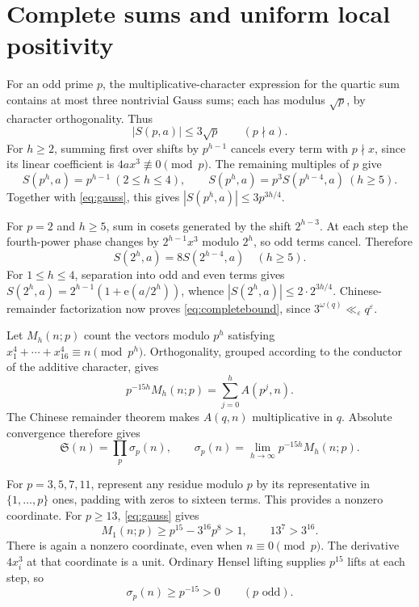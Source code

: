 \documentclass[11pt]{article}
\theoremstyle{remark}\newtheorem*{remark}{Remark}
\newcommand{\e}{\mathrm e}
\newcommand{\eps}{\varepsilon}
\newcommand{\SSS}{\mathfrak S}
\begin{document}
\section{Complete sums and uniform local positivity}\label{sec:complete}

For an odd prime \(p\), the multiplicative-character expression for the
quartic sum contains at most three nontrivial Gauss sums; each has
modulus \(\sqrt p\), by character orthogonality. Thus
\begin{equation}\label{eq:gauss}
 |S(p,a)|\le3\sqrt p\qquad(p\nmid a).
\end{equation}
For \(h\ge2\), summing first over shifts by \(p^{h-1}\) cancels
every term with \(p\nmid x\), since its linear coefficient is
\(4ax^3\not\equiv0\pmod p\). The remaining multiples of \(p\) give
\begin{equation}\label{eq:oddrec}
 S(p^h,a)=p^{h-1}\ (2\le h\le4),\qquad
 S(p^h,a)=p^3S(p^{h-4},a)\ (h\ge5).
\end{equation}
Together with \eqref{eq:gauss}, this gives
\(|S(p^h,a)|\le3p^{3h/4}\).

For \(p=2\) and \(h\ge5\), sum in cosets generated by the shift
\(2^{h-3}\). At each step the fourth-power phase changes by
\(2^{h-1}x^3\) modulo \(2^h\), so odd terms cancel. Therefore
\[
 S(2^h,a)=8S(2^{h-4},a)\quad(h\ge5).
\]
For \(1\le h\le4\), separation into odd and even terms gives
\(S(2^h,a)=2^{h-1}(1+\e(a/2^h))\), whence
\(|S(2^h,a)|\le2\cdot2^{3h/4}\). Chinese-remainder factorization
now proves \eqref{eq:completebound}, since
\(3^{\omega(q)}\ll_\eps q^\eps\).

Let \(M_h(n;p)\) count the vectors modulo \(p^h\) satisfying
\(x_1^4+\cdots+x_{16}^4\equiv n\pmod{p^h}\). Orthogonality,
grouped according to the conductor of the additive character, gives
\begin{equation}\label{eq:localcount}
 p^{-15h}M_h(n;p)=\sum_{j=0}^h A(p^j,n).
\end{equation}
The Chinese remainder theorem makes \(A(q,n)\) multiplicative in
\(q\). Absolute convergence therefore gives
\begin{equation}\label{eq:localprod}
 \SSS(n)=\prod_p\sigma_p(n),\qquad
 \sigma_p(n)=\lim_{h\to\infty}p^{-15h}M_h(n;p).
\end{equation}

For \(p=3,5,7,11\), represent any residue modulo \(p\) by its
representative in \(\{1,\ldots,p\}\) ones, padding with zeros to
sixteen terms. This provides a nonzero coordinate. For \(p\ge13\),
\eqref{eq:gauss} gives
\[
 M_1(n;p)\ge p^{15}-3^{16}p^8>1,
 \qquad 13^7>3^{16}.
\]
There is again a nonzero coordinate, even when \(n\equiv0\pmod p\).
The derivative \(4x_i^3\) at that coordinate is a unit. Ordinary
Hensel lifting supplies \(p^{15}\) lifts at each step, so
\begin{equation}\label{eq:oddlocal}
 \sigma_p(n)\ge p^{-15}>0\qquad(p\text{ odd}).
\end{equation}
\end{document}
